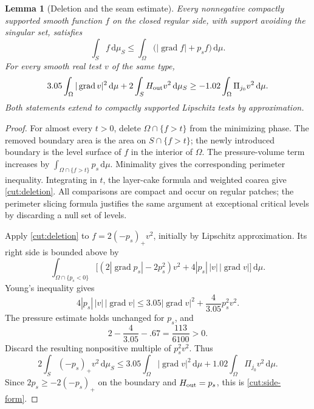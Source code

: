 \documentclass[11pt]{article}
\numberwithin{equation}{section}
\newtheorem{lemma}[theorem]{Lemma}
\theoremstyle{definition}
\theoremstyle{remark}
\begin{document}
\begin{lemma}[Deletion and the seam estimate]\label{cut:side-estimate}
Every nonnegative compactly supported smooth function $f$ on the
closed regular side, with support avoiding the singular set, satisfies
\begin{equation}\label{cut:deletion}
       \int_S f\,\mathrm d\mu_S
       \le\int_\Omega\bigl(|\operatorname{grad} f|+p_sf\bigr)\,\mathrm d\mu.
\end{equation}
For every smooth real test $v$ of the same type,
\begin{equation}\label{cut:side-form}
 3.05\int_\Omega|\operatorname{grad} v|^2\,\mathrm d\mu
       +2\int_S H_{\rm out}v^2\,\mathrm d\mu_S
       \ge-1.02\int_\Omega\Pi_{j_0}v^2\,\mathrm d\mu.
\end{equation}
Both statements extend to compactly supported Lipschitz tests by
approximation.
\end{lemma}

\begin{proof}
For almost every $t>0$, delete $\Omega\cap\{f>t\}$ from the minimizing
phase.  The removed boundary area is the area on $S\cap\{f>t\}$;
the newly introduced boundary is the level surface of $f$ in the
interior of $\Omega$.  The pressure-volume term increases by
$\int_{\Omega\cap\{f>t\}}p_s\,\mathrm d\mu$.  Minimality gives the
corresponding perimeter inequality.  Integrating in $t$, the layer-cake
formula and weighted coarea give \eqref{cut:deletion}.  All comparisons
are compact and occur on regular patches; the perimeter slicing formula
justifies the same argument at exceptional critical levels by discarding
a null set of levels.

Apply \eqref{cut:deletion} to $f=2(-p_s)_+v^2$, initially by Lipschitz
approximation.  Its right side is bounded above by
\[
 \int_{\Omega\cap\{p_s<0\}}
       \bigl[(2|\operatorname{grad} p_s|-2p_s^2)v^2
                         +4|p_s|\,|v|\,|\operatorname{grad} v|\bigr]\,\mathrm d\mu.
\]
Young's inequality gives
\[
 4|p_s|\,|v|\,|\operatorname{grad} v|
        \le3.05|\operatorname{grad} v|^2+\frac4{3.05}p_s^2v^2.
\]
The pressure estimate holds unchanged for $p_s$, and
\begin{equation}\label{cut:young-margin}
                2-\frac4{3.05}-.67=\frac{113}{6100}>0.
\end{equation}
Discard the resulting nonpositive multiple of $p_s^2v^2$.  Thus
\[
 2\int_S(-p_s)_+v^2\,\mathrm d\mu_S
 \le3.05\int_\Omega|\operatorname{grad} v|^2\,\mathrm d\mu
                  +1.02\int_\Omega\Pi_{j_0}v^2\,\mathrm d\mu.
\]
Since $2p_s\ge-2(-p_s)_+$ on the boundary and
$H_{\rm out}=p_s$, this is \eqref{cut:side-form}.
\end{proof}
\end{document}
